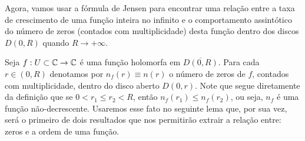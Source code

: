     \bigskip 
    
    
    Agora, vamos usar a fórmula de Jensen para encontrar uma relação entre a
    taxa de crescimento de uma função inteira no infinito e o comportamento
    assintótico do número de zeros (contados com multiplicidade) desta
    função dentro dos discos $D(0,R)$ quando $R\to +\infty$.
    
    
    Seja $f:U\subset\mathbb{C}\to\mathbb{C}$ é uma função holomorfa em $\overline{D(0,R)}$.
    Para cada $r\in (0,R)$ denotamos por $n_f(r) \equiv n(r)$ o número de zeros 
    de $f$, contados com multiplicidade, dentro do disco aberto $D(0,r)$.
    Note que segue diretamente da definição que se $0 < r_1 \leq r_2 < R$, então
    $n_f(r_1) \leq n_f(r_2)$, ou seja, $n_f$ é uma função não-decrescente. Usaremos
    esse fato no seguinte lema que, por sua vez, será o primeiro de dois resultados
    que nos permitirão extrair a relação entre: zeros e a ordem de uma função.
    
